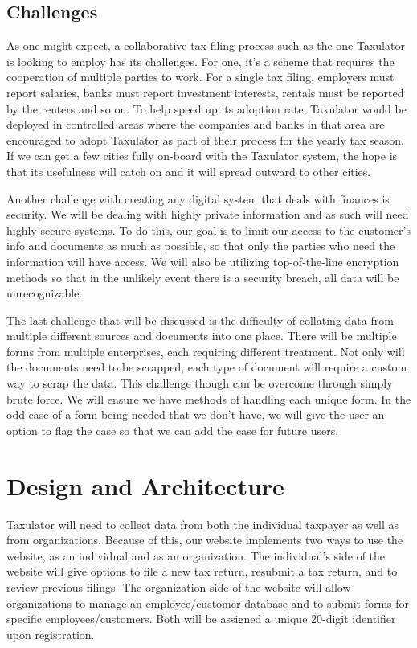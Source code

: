 \documentclass[sigconf]{acmart}
\begin{document}
\subsection{Challenges}
As one might expect, a collaborative tax filing process such as the one Taxulator is looking to employ has its challenges. For one, it’s a scheme that requires the cooperation of multiple parties to work. For a single tax filing, employers must report salaries, banks must report investment interests, rentals must be reported by the renters and so on. To help speed up its adoption rate, Taxulator would be deployed in controlled areas where the companies and banks in that area are encouraged to adopt Taxulator as part of their process for the yearly tax season. If we can get a few cities fully on-board with the Taxulator system, the hope is that its usefulness will catch on and it will spread outward to other cities.

Another challenge with creating any digital system that deals with finances is security. We will be dealing with highly private information and as such will need highly secure systems. To do this, our goal is to limit our access to the customer’s info and documents as much as possible, so that only the parties who need the information will have access. We will also be utilizing top-of-the-line encryption methods so that in the unlikely event there is a security breach, all data will be unrecognizable.

The last challenge that will be discussed is the difficulty of collating data from multiple different sources and documents into one place. There will be multiple forms from multiple enterprises, each requiring different treatment. Not only will the documents need to be scrapped, each type of document will require a custom way to scrap the data. This challenge though can be overcome through simply brute force. We will ensure we have methods of handling each unique form. In the odd case of a form being needed that we don’t have, we will give the user an option to flag the case so that we can add the case for future users.

\section{Design and Architecture}
Taxulator will need to collect data from both the individual taxpayer as well as from organizations. Because of this, our website implements two ways to use the website, as an individual and as an organization. The individual’s side of the website will give options to file a new tax return, resubmit a tax return, and to review previous filings. The organization side of the website will allow organizations to manage an employee/customer database and to submit forms for specific employees/customers. Both will be assigned a unique 20-digit identifier upon registration.
\end{document}
